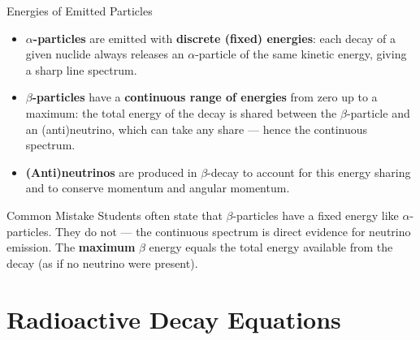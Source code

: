 \begin{keybox}{Energies of Emitted Particles}
\begin{itemize}[itemsep=2pt]
  \item \textbf{$\alpha$-particles} are emitted with \textbf{discrete (fixed) energies}: each decay of a given nuclide always releases an $\alpha$-particle of the same kinetic energy, giving a sharp line spectrum.
  \item \textbf{$\beta$-particles} have a \textbf{continuous range of energies} from zero up to a maximum: the total energy of the decay is shared between the $\beta$-particle and an (anti)neutrino, which can take any share — hence the continuous spectrum.
  \item \textbf{(Anti)neutrinos} are produced in $\beta$-decay to account for this energy sharing and to conserve momentum and angular momentum.
\end{itemize}
\end{keybox}

\begin{center}
\end{center}

\begin{warningbox}{Common Mistake}
Students often state that $\beta$-particles have a fixed energy like $\alpha$-particles. They do not — the continuous spectrum is direct evidence for neutrino emission. The \textbf{maximum} $\beta$ energy equals the total energy available from the decay (as if no neutrino were present).
\end{warningbox}

\section{Radioactive Decay Equations}

